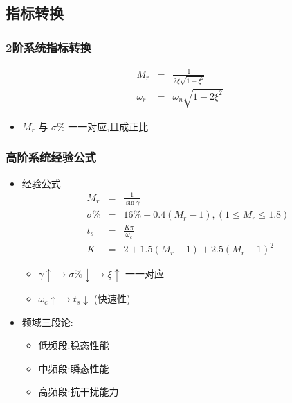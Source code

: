 \documentclass[table]{article}
\begin{document}
\subsection{指标转换}
\label{sec-5-2}
\begin{frame}
\frametitle{2阶系统指标转换}
\label{sec-5-2-1}

\begin{eqnarray*}
M_r & = &\frac{1}{2\xi\sqrt{1-\xi^2}} \\
\omega_r &=& \omega_n\sqrt{1-2\xi^2}
\end{eqnarray*}
\begin{itemize}
\item <2->$M_r$ 与 $\sigma\%$ 一一对应,且成正比
\end{itemize}
\end{frame}
\begin{frame}
\frametitle{高阶系统经验公式}
\label{sec-5-2-2}
\begin{itemize}

\item 经验公式
\label{sec-5-2-2-1}%
\begin{eqnarray*}
M_r & = & \frac{1}{\sin\gamma}\\
\sigma\% &=& 16\%+0.4(M_r-1), (1\leq M_r\leq 1.8) \\
t_s &=& \frac{K\pi}{\omega_c}\\
K&=& 2+1.5(M_r-1)+2.5(M_r-1)^2 
\end{eqnarray*}

\begin{itemize}
\item <2->$\gamma\uparrow \rightarrow \sigma\%\downarrow \rightarrow \xi\uparrow$  一一对应
\item <3->$\omega_c\uparrow \rightarrow t_s\downarrow$ (快速性)
\end{itemize}


\item 频域三段论:
\label{sec-5-2-2-2}%
\begin{itemize}
\item 低频段:稳态性能
\item 中频段:瞬态性能
\item 高频段:抗干扰能力
\end{itemize}

\end{itemize} %
\end{frame}
\end{document}

